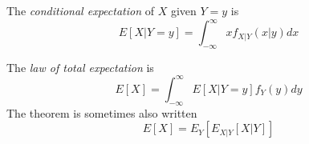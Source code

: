 The \emph{conditional expectation} of $X$ given $Y=y$ is
\begin{equation}
    E[X|Y=y] = \int_{-\infty}^{\infty}xf_{X|Y}(x|y)dx
\end{equation}

The \emph{law of total expectation} is
\begin{equation}
    E[X] = \int_{-\infty}^{\infty} E[X|Y=y]f_Y(y)dy
\end{equation}
The theorem is sometimes also written
\begin{equation}
    E[X] = E_Y[E_{X|Y}[X|Y]]
\end{equation}